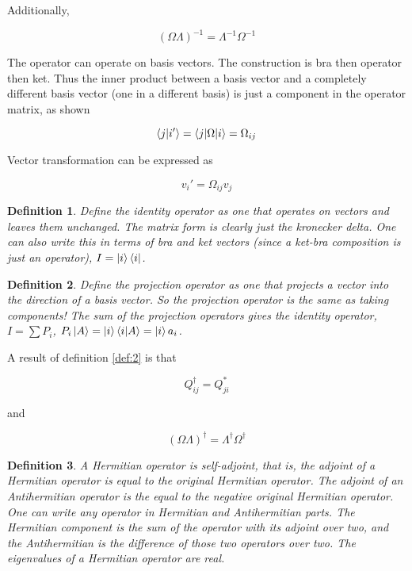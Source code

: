 \documentclass{tufte-book}
\newtheorem{definition}{Definition}
\begin{document}
Additionally,

\begin{equation}
	\label{eq:4}
	(\Omega\Lambda)^{-1} = \Lambda^{-1}\Omega^{-1}
\end{equation}

The operator can operate on basis vectors. The construction is bra then operator then ket. Thus the inner product between a basis vector and a completely different basis vector (one in a different basis) is just a component in the operator matrix, as shown

\begin{equation}
	\label{eq:5}
	\braket{j|i'} = \braket{j|\Omega|i} = \Omega_{ij}
\end{equation}

Vector transformation can be expressed as

\begin{equation}
	\label{eq:6}
	v_i' = \Omega_{ij}v_j
\end{equation}

\begin{definition}
	\label{def:8}
	Define the identity operator as one that operates on vectors and leaves them unchanged. The matrix form is clearly just the kronecker delta. One can also write this in terms of bra and ket vectors (since a ket-bra composition is just an operator), $I = \ket{i}\bra{i}$.
\end{definition}

\begin{definition}
  \label{def:9}
  Define the projection operator as one that projects a vector into the direction of a basis vector. So the projection operator is the same as taking components! The sum of the projection operators gives the identity operator, $I = \sum P_i$, $P_i\ket{A} = \ket{i}\braket{i|A} = \ket{i}a_i$.
\end{definition}

A result of definition \ref{def:2} is that

\begin{equation}
	\label{eq:7}
	Q_{ij}^{\dag} = Q_{ji}^*
\end{equation}

and

\begin{equation}
	\label{eq:8}
	(\Omega\Lambda)^{\dag} = \Lambda^{\dag}\Omega^{\dag}
\end{equation}

\begin{definition}
  \label{def:10}
  A Hermitian operator is self-adjoint, that is, the adjoint of a Hermitian operator is equal to the original Hermitian operator. The adjoint of an Antihermitian operator is the equal to the negative original Hermitian operator. One can write any operator in Hermitian and Antihermitian parts. The Hermitian component is the sum of the operator with its adjoint over two, and the Antihermitian is the difference of those two operators over two. The eigenvalues of a Hermitian operator are real.
\end{definition}
\end{document}
